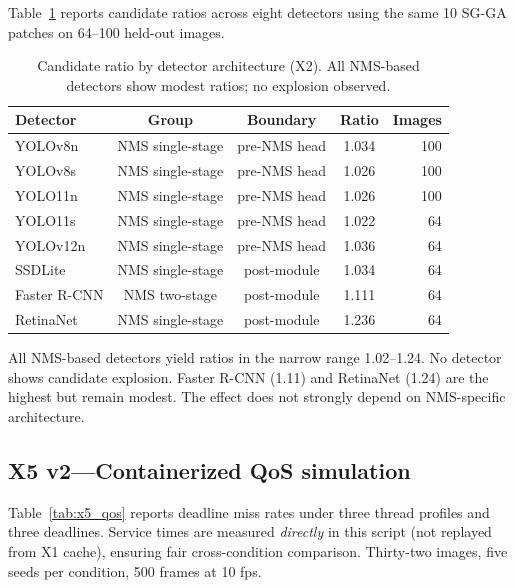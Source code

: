 \documentclass[a4paper,fleqn]{cas-dc}
\begin{document}
Table~\ref{tab:x2_arch} reports candidate ratios across eight detectors using the same 10 SG-GA patches on 64--100 held-out images.

\begin{table}[t]
\centering
\caption{Candidate ratio by detector architecture (X2). All NMS-based detectors show modest ratios; no explosion observed.}
\label{tab:x2_arch}
\small
\begin{tabular}{lcccr{1.5cm}}
\toprule
\textbf{Detector} & \textbf{Group} & \textbf{Boundary} & \textbf{Ratio} & \textbf{Images} \\
\midrule
YOLOv8n & NMS single-stage & pre-NMS head & 1.034 & 100 \\
YOLOv8s & NMS single-stage & pre-NMS head & 1.026 & 100 \\
YOLO11n & NMS single-stage & pre-NMS head & 1.026 & 100 \\
YOLO11s & NMS single-stage & pre-NMS head & 1.022 & 64 \\
YOLOv12n & NMS single-stage & pre-NMS head & 1.036 & 64 \\
SSDLite & NMS single-stage & post-module & 1.034 & 64 \\
Faster R-CNN & NMS two-stage & post-module & 1.111 & 64 \\
RetinaNet & NMS single-stage & post-module & 1.236 & 64 \\
\bottomrule
\end{tabular}
\end{table}

All NMS-based detectors yield ratios in the narrow range 1.02--1.24. No detector shows candidate explosion. Faster R-CNN (1.11) and RetinaNet (1.24) are the highest but remain modest. The effect does not strongly depend on NMS-specific architecture.

\subsection{X5 v2---Containerized QoS simulation}

Table~\ref{tab:x5_qos} reports deadline miss rates under three thread profiles and three deadlines. Service times are measured \emph{directly} in this script (not replayed from X1 cache), ensuring fair cross-condition comparison. Thirty-two images, five seeds per condition, 500 frames at 10 fps.
\end{document}
